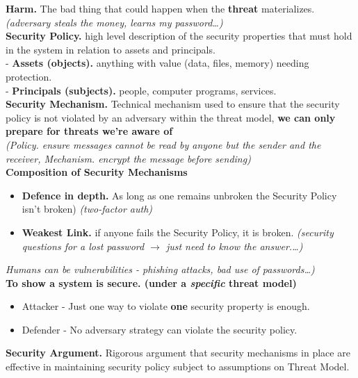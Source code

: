 \documentclass[main.tex]{subfiles}
\begin{document}
\begin{minipage}[t]{0.495\textwidth}
	\noindent \textbf{Harm.} The bad thing that could happen when the \textbf{threat} materializes. \textit{(adversary steals the money, learns my password\dots)}\\
	\noindent \textbf{Security Policy.} high level description of the security properties that must hold in the system in relation to assets and principals.\\
	- \textbf{Assets (objects).} anything with value (data, files, memory) needing protection.\\
	- \textbf{Principals (subjects).} people, computer programs, services.\\
	\noindent \textbf{Security Mechanism.} Technical mechanism used to ensure that the security policy is not violated by an adversary within the threat model, \textbf{we can only prepare for threats we're aware of} \\\textit{(Policy. ensure messages cannot be read by anyone but the sender and the receiver, Mechanism. encrypt the message before sending)}\\
	\noindent \textbf{Composition of Security Mechanisms}
	\begin{itemize}
		\item[-] \textbf{Defence in depth.} As long as one remains unbroken the Security Policy isn't broken) \textit{(two-factor auth)}
		\item[-] \textbf{Weakest Link.} if anyone fails the Security Policy, it is broken. \textit{(security questions for a lost password $\rightarrow$ just need to know the answer.\dots)}
	\end{itemize}
	\textit{Humans can be vulnerabilities - phishing attacks, bad use of passwords\dots)}\\
	\noindent \textbf{To show a system is secure. (under a \textit{specific} threat model)}
	\begin{itemize}
		\item[] Attacker - Just one way to violate \textbf{one} security property is enough.
		\item[] Defender - No adversary strategy can violate the security policy.
	\end{itemize}
	\noindent \textbf{Security Argument.} Rigorous argument that security mechanisms in place are effective in maintaining security policy subject to assumptions on Threat Model.
\end{minipage}
\hline
\end{document}
